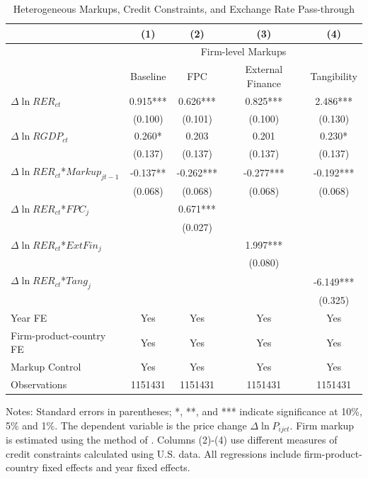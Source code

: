 \documentclass[12pt]{article}
\begin{document}
\begin{table}[htbp]
	\centering
	\caption{Heterogeneous Markups, Credit Constraints, and Exchange Rate Pass-through}
	\begin{threeparttable}
		\begin{tabular}{lcccc}
			\toprule         
			& (1)   & (2)   & (3)   & (4)     \\
			\midrule
			& \multicolumn{4}{c}{Firm-level Markups}      \\
			& Baseline      & FPC & External Finance& Tangibility        \\
			\midrule
			$\Delta \ln RER_{ct}$ & 0.915*** & 0.626*** & 0.825*** & 2.486***\\
			& (0.100) & (0.101) & (0.100) & (0.130) \\
			$\Delta \ln RGDP_{ct}$ & 0.260*	& 0.203 & 0.201 & 0.230*\\
			& (0.137) & (0.137) & (0.137) & (0.137)  \\
			$\Delta \ln RER_{ct}$*$Markup_{jt-1}$ & -0.137** & -0.262*** & -0.277*** & -0.192*** \\
			& (0.068) & (0.068) & (0.068) & (0.068) \\
			$\Delta \ln RER_{ct}$*$FPC_{j}$ &       & 0.671*** &       &  \\
			&       & (0.027) &       &   \\
			$\Delta \ln RER_{ct}$*$ExtFin_{j}$ &       &       & 1.997*** &  \\
			&       &       & (0.080) &   \\
			$\Delta \ln RER_{ct}$*$Tang_{j}$  &       &       &       & -6.149*** \\
			&       &       &       & (0.325) \\
			Year FE  & Yes   & Yes   & Yes   & Yes       \\
			Firm-product-country FE & Yes   & Yes   & Yes   & Yes       \\
			Markup Control & Yes   & Yes   & Yes   & Yes       \\
			Observations & 1151431 & 1151431 & 1151431 & 1151431  \\
			\bottomrule
		\end{tabular}
		\begin{tablenotes}
			\footnotesize
			\item[Notes:] Standard errors in parentheses; *, **, and *** indicate significance at 10\%, 5\% and 1\%. The dependent variable is the price change $\Delta \ln P_{ijct}$. Firm markup is estimated using the method of \cite{dlw2012}. Columns (2)-(4) use different measures of credit constraints calculated using U.S. data. All regressions include firm-product-country fixed effects and year fixed effects.
		\end{tablenotes}
	\end{threeparttable}
        \label{tab.markup}
\end{table}
\end{document}
